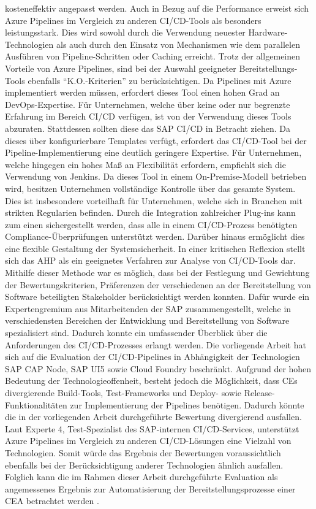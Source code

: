kosteneffektiv angepasst werden. Auch in Bezug auf die Performance erweist sich Azure Pipelines im Vergleich zu anderen CI/CD-Tools als besonders leistungsstark. Dies wird sowohl durch die Verwendung neuester Hardware-Technologien als auch durch den Einsatz von Mechanismen wie dem parallelen Ausführen von Pipeline-Schritten oder Caching erreicht.  Trotz der allgemeinen Vorteile von Azure Pipelines, sind bei der Auswahl geeigneter Bereitstellungs-Tools ebenfalls \enquote{K.O.-Kriterien} zu berücksichtigen. Da Pipelines mit Azure implementiert werden müssen, erfordert dieses Tool einen hohen Grad an DevOps-Expertise. Für Unternehmen, welche über keine oder nur begrenzte Erfahrung im Bereich CI/CD verfügen, ist von der Verwendung dieses Tools abzuraten. Stattdessen sollten diese das SAP CI/CD in Betracht ziehen. Da dieses über konfigurierbare Templates verfügt, erfordert das CI/CD-Tool bei der Pipeline-Implementierung eine deutlich geringere Expertise. Für Unternehmen, welche hingegen ein hohes Maß an Flexibilität erfordern, empfiehlt sich die Verwendung von Jenkins. Da dieses Tool in einem On-Premise-Modell betrieben wird, besitzen Unternehmen vollständige Kontrolle über das gesamte System. Dies ist insbesondere vorteilhaft für Unternehmen, welche sich in Branchen mit strikten Regularien befinden. Durch die Integration zahlreicher Plug-ins kann zum einen sichergestellt werden, dass alle in einem CI/CD-Prozess benötigten Compliance-Überprüfungen unterstützt werden. Darüber hinaus ermöglicht dies eine flexible Gestaltung der Systemsicherheit. In einer kritischen Reflexion stellt sich das AHP als ein geeignetes Verfahren zur Analyse von CI/CD-Tools dar. Mithilfe dieser Methode war es möglich, dass bei der Festlegung und Gewichtung der Bewertungskriterien, Präferenzen der verschiedenen an der Bereitstellung von Software beteiligten Stakeholder berücksichtigt werden konnten. Dafür wurde ein Expertengremium aus Mitarbeitenden der SAP zusammengestellt, welche in verschiedensten Bereichen der Entwicklung und Bereitstellung von Software spezialisiert sind. Dadurch konnte ein umfassender Überblick über die Anforderungen des CI/CD-Prozesses erlangt werden. Die vorliegende Arbeit hat sich auf die Evaluation der CI/CD-Pipelines in Abhängigkeit der Technologien SAP CAP Node, SAP UI5 sowie Cloud Foundry beschränkt. Aufgrund der hohen Bedeutung der Technologieoffenheit, besteht jedoch die Möglichkeit, dass CEs divergierende Build-Tools, Test-Frameworks und Deploy- sowie Release-Funktionalitäten zur Implementierung der Pipelines benötigen. Dadurch könnte die in der vorliegenden Arbeit durchgeführte Bewertung divergierend ausfallen. Laut Experte 4, Test-Spezialist des SAP-internen CI/CD-Services, unterstützt Azure Pipelines im Vergleich zu anderen CI/CD-Lösungen eine Vielzahl von Technologien. Somit würde das Ergebnis der Bewertungen voraussichtlich ebenfalls bei der Berücksichtigung anderer Technologien ähnlich ausfallen. Folglich kann die im Rahmen dieser Arbeit durchgeführte Evaluation als angemessenes Ergebnis zur Automatisierung der Bereitstellungsprozesse einer CEA betrachtet werden \cite[Z. 59 ff.]{TestDeveloperSAPHyperspaceAdoption&Onboarding.}.

